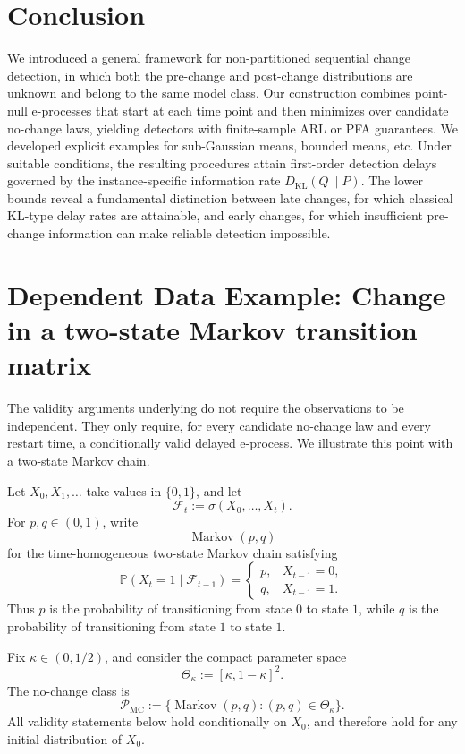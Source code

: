 \documentclass[12pt]{article}
\DeclareMathOperator{\Markov}{Markov}
\theoremstyle{spaced}
\theoremstyle{remark}
\begin{document}
\section{Conclusion}

We introduced a general framework for non-partitioned sequential change detection, in which both the pre-change and post-change distributions are unknown and belong to the same model class. Our construction combines point-null e-processes that start at each time point and then minimizes over candidate no-change laws, yielding detectors with finite-sample ARL or PFA guarantees. We developed explicit examples for sub-Gaussian means, bounded means, etc. Under suitable conditions, the resulting procedures attain first-order detection delays governed by the instance-specific information rate \(D_{\mathrm{KL}}(Q\|P)\). The lower bounds reveal a fundamental distinction between late changes, for which classical KL-type delay rates are attainable, and early changes, for which insufficient pre-change information can make reliable detection impossible.




\appendix

\section{Dependent Data Example: Change in a two-state Markov transition matrix}
\label{sec:markov-example}

The validity arguments underlying 
do not require the observations to be independent.  They only require,
for every candidate no-change law and every restart time, a conditionally
valid delayed e-process.  We illustrate this point with a two-state Markov
chain.

Let \(X_0,X_1,\ldots\) take values in \(\{0,1\}\), and let
\[
    \mathcal F_t:=\sigma(X_0,\ldots,X_t).
\]
For \(p,q\in(0,1)\), write
\[
    \Markov(p,q)
\]
for the time-homogeneous two-state Markov chain satisfying
\[
    \mathbb P(X_t=1\mid\mathcal F_{t-1})
    =
    \begin{cases}
        p, & X_{t-1}=0,\\
        q, & X_{t-1}=1.
    \end{cases}
\]
Thus \(p\) is the probability of transitioning from state \(0\) to
state \(1\), while \(q\) is the probability of transitioning from
state \(1\) to state \(1\).

Fix \(\kappa\in(0,1/2)\), and consider the compact parameter space
\[
    \Theta_\kappa
    :=
    [\kappa,1-\kappa]^2.
\]
The no-change class is
\[
    \mathcal P_{\mathrm{MC}}
    :=
    \{
        \Markov(p,q):(p,q)\in\Theta_\kappa
    \}.
\]
All validity statements below hold conditionally on \(X_0\), and
therefore hold for any initial distribution of \(X_0\).
\end{document}
